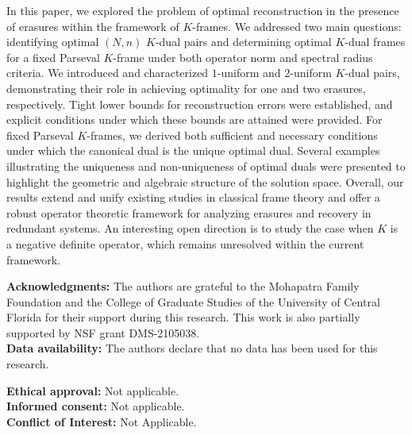 \documentclass[final,1p,times]{elsarticle}
\begin{document}
In this paper, we explored the problem of optimal reconstruction in the presence of erasures within the framework of $K$-frames. We addressed two main questions: identifying optimal $(N,n)$ $K$-dual pairs and determining optimal $K$-dual frames for a fixed Parseval $K$-frame under both operator norm and spectral radius criteria. We introduced and characterized $1$-uniform and $2$-uniform $K$-dual pairs, demonstrating their role in achieving optimality for one and two erasures, respectively. Tight lower bounds for reconstruction errors were established, and explicit conditions under which these bounds are attained were provided. For fixed Parseval $K$-frames, we derived both sufficient and necessary conditions under which the canonical dual is the unique optimal dual. Several examples illustrating the uniqueness and non-uniqueness of optimal duals were presented to highlight the geometric and algebraic structure of the solution space. Overall, our results extend and unify existing studies in classical frame theory and offer a robust operator theoretic framework for analyzing erasures and recovery in redundant systems. An interesting open direction is to study the case when $K$ is a negative definite operator, which remains unresolved within the current framework.

    
    \vspace{1cm}

	

	\noindent
	{\bf Acknowledgments:} 
	The authors are grateful to the Mohapatra Family Foundation and the College of Graduate Studies of the University of Central Florida for their support during this research. This work is also partially supported by NSF grant DMS-2105038.\\
    
    \noindent
	{\bf Data availability: } 
	The authors declare that no data has been used for this research.

\noindent
	{\bf Ethical approval: }  Not applicable.\\
\noindent
	{\bf Informed consent: } Not applicable.\\
\noindent
	{\bf Conflict of Interest:} Not Applicable.
\end{document}
